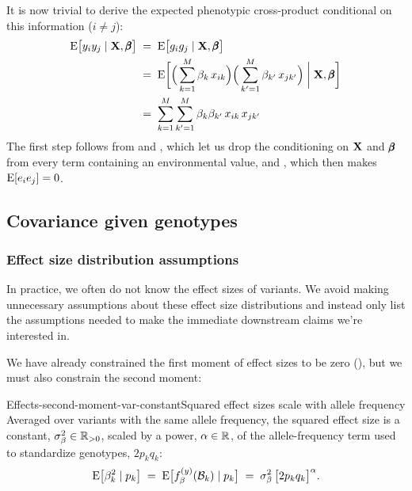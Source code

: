 \documentclass[12pt]{article}
\numberwithin{equation}{section}
\begin{document}
It is now trivial to derive the expected phenotypic cross-product conditional on this information ($i \neq j$):
\begin{equation}\label{eq:cov-geno-effects}
\begin{aligned}
    \mathrm{E}\big[y_i y_j \mid \mathbf{X}, \pmb{\beta}\big]
    \;&=\; \mathrm{E}\big[g_i g_j \mid \mathbf{X}, \pmb{\beta}\big] \\
    \;&=\; \mathrm{E}\bigg[\Big(\sum_{k=1}^{M} \beta_k\, x_{ik}\Big) \Big(\sum_{k'=1}^{M} \beta_{k'}\, x_{jk'}\Big) \;\bigg|\; \mathbf{X}, \pmb{\beta}\bigg] \\
    \;&=\; \sum_{k=1}^{M} \sum_{k'=1}^{M} \beta_k \beta_{k'}\, x_{ik}\, x_{jk'}
\end{aligned}
\end{equation}
The first step follows from  and , which let us drop the conditioning on $\mathbf{X}$ and $\pmb{\beta}$ from every term containing an environmental value, and , which then makes $\mathrm{E}[e_i e_j] = 0$.

\subsection{Covariance given genotypes}\label{sec:rm-cov-geno}

\subsubsection{Effect size distribution assumptions}\label{sec:effect-size-dist}

In practice, we often do not know the effect sizes of variants.
We avoid making unnecessary assumptions about these effect size distributions and instead only list the assumptions needed to make the immediate downstream claims we're interested in.

We have already constrained the first moment of effect sizes to be zero (), but we must also constrain the second moment:

\begin{assumption}{Effects-second-moment-var-constant}{Squared effect sizes scale with allele frequency}
Averaged over variants with the same allele frequency, the squared effect size is a constant, $\sigma_\beta^2 \in \mathbb{R}_{>0}$, scaled by a power, $\alpha \in \mathbb{R}$, of the allele-frequency term used to standardize genotypes, $2p_k q_k$:
$$ \mathrm{E}\big[\beta_k^2 \mid p_k\big] \;=\; \mathrm{E}\big[f_\beta^{(y)}(\mathcal{B}_k) \mid p_k\big] \;=\; \sigma_\beta^2 \, \big[2p_k q_k\big]^{\alpha} . $$
\end{assumption}
\end{document}
